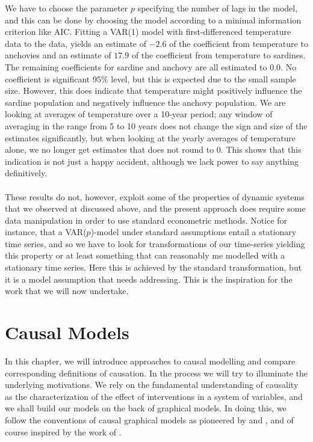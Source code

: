 \documentclass[11pt, a4paper]{memoir}
\theoremstyle{break}
\theoremstyle{break}
\theoremstyle{nonumberplain}
\begin{document}
We have to choose the parameter $p$ specifying the number of lags in the model, and this can be done by choosing the model according to a minimal information criterion like AIC. Fitting a VAR(1) model with first-differenced temperature data to the data, yields an estimate of $-2.6$ of the coefficient from temperature to anchovies and an estimate of $17.9$ of the coefficient from temperature to sardines. The remaining coefficients for sardine and anchovy are all estimated to $0.0$. No coefficient is significant 95\% level, but this is expected due to the small sample size. However, this does indicate that temperature might positively influence the sardine population and negatively influence the anchovy population. We are looking at averages of temperature over a 10-year period; any window of averaging in the range from 5 to 10 years does not change the sign and size of the estimates significantly, but when looking at the yearly averages of temperature alone, we no longer get estimates that does not round to 0. This shows that this indication is not just a happy accident, although we lack power to say anything definitively.\\\\ 
These results do not, however, exploit some of the properties of dynamic systems that we observed at discussed above, and the present approach does require some data manipulation in order to use standard econometric methods. Notice for instance, that a VAR($p$)-model under standard assumptions entail a stationary time series, and so we have to look for transformations of our time-series yielding this property or at least something that can reasonably me modelled with a stationary time series. Here this is achieved by the standard transformation, but it is a model assumption that needs addressing. This is the inspiration for the work that we will now undertake.

\chapter{Causal Models}
In this chapter, we will introduce approaches to causal modelling and compare corresponding definitions of causation. In the process we will try to illuminate the underlying motivations. We rely on the fundamental understanding of causality as the characterization of the effect of interventions in a system of variables, and we shall build our models on the back of graphical models. In doing this, we follow the conventions of causal graphical  models as pioneered by \cite{Spirtes} and \cite{Pearl}, and of course inspired by the work of \cite{Steffen}.
\end{document}
